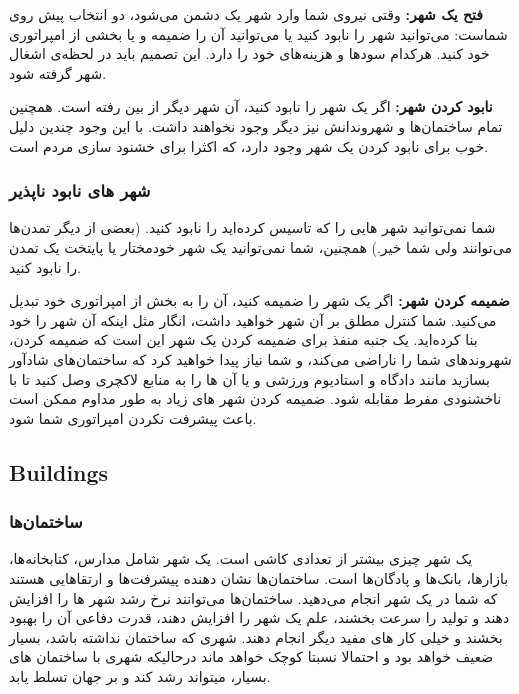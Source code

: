 \documentclass[]{article}
\begin{document}
\noindent \textbf{فتح یک شهر:}
وقتی نیروی شما وارد شهر یک دشمن می‌شود، دو انتخاب پیش روی شماست: می‌توانید شهر را نابود کنید یا می‌توانید آن را ضمیمه و یا بخشی از امپراتوری خود کنید. هرکدام سود‌ها و هزینه‌های خود را دارد. این تصمیم باید در لحظه‌ی اشغال شهر گرفته شود.

\noindent \textbf{نابود کردن شهر:}
اگر یک شهر را نابود کنید، آن شهر دیگر از بین رفته است. همچنین تمام ساختمان‌ها و شهروندانش نیز دیگر وجود نخواهند داشت. با این وجود چندین دلیل خوب برای نابود کردن یک شهر وجود دارد، که اکثرا برای خشنود سازی مردم است.

\subsubsection*{{\titr شهر های نابود ناپذیر}}
شما نمی‌توانید شهر هایی را که تاسیس کرده‌اید را نابود کنید. (بعضی از دیگر تمدن‌ها می‌‌توانند ولی شما خیر.) همچنین، شما نمی‌توانید یک شهر خودمختار یا پایتخت یک تمدن را نابود کنید.

\noindent \textbf{ضمیمه کردن شهر:} اگر یک شهر را ضمیمه کنید، آن را به بخش از امپراتوری خود تبدیل می‌کنید. شما کنترل مطلق بر آن شهر خواهید داشت، انگار مثل اینکه آن شهر را خود بنا کرده‌اید. یک جنبه منفذ برای ضمیمه کردن یک شهر این است که ضمیمه کردن، شهروندهای شما را ناراضی می‌کند،  و شما نیاز پیدا خواهید کرد که ساختمان‌های شادآور بسازید مانند دادگاه و استادیوم ورزشی  و یا آن ها را به منابع لاکچری وصل کنید تا با ناخشنودی مفرط مقابله شود. ضمیمه کردن شهر های زیاد به طور مداوم ممکن است باعث پیشرفت نکردن امپراتوری شما شود.


\subsection*{{\titr Buildings}}

\subsubsection*{{\titr ساختمان‌ها}}
یک شهر چیزی بیشتر از تعدادی کاشی است. یک شهر شامل مدارس، کتابخانه‌ها، بازارها، بانک‌ها و پادگان‌ها است. ساختمان‌ها نشان دهنده پیشرفت‌ها و ارتقا‌هایی هستند که شما در یک شهر انجام می‌دهید. 
ساختمان‌ها می‌توانند نرخ رشد شهر ها را افزایش دهند و تولید را سرعت بخشند، علم یک شهر را افزایش دهند، قدرت دفاعی آن را بهبود بخشند و خیلی کار های مفید دیگر انجام دهند.
شهری که ساختمان نداشته باشد‌، بسیار ضعیف خواهد بود و احتمالا نسبتا کوچک خواهد ماند درحالیکه شهری با ساختمان های بسیار، میتواند رشد کند و بر جهان تسلط یابد.
\end{document}
